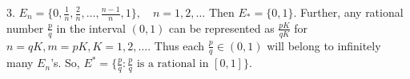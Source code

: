 \documentclass[preview]{standalone}
\begin{document}
\begin{center}
3. $E_n = \{0, \frac{1}{n}, \frac{2}{n}, \dots, \frac{n-1}{n}, 1\}, \quad n = 1, 2, \dots$ Then $E_* = \{0, 1\}$. Further, any rational number $\frac{p}{q}$ in the interval $(0, 1)$ can be represented as $\frac{pK}{qK}$ for $n = qK, m = pK, K = 1, 2, \dots$. Thus each $\frac{p}{q} \in (0, 1)$ will belong to infinitely many $E_n$'s. So, $E^* = \{\frac{p}{q}: \frac{p}{q} \text{ is a rational in } [0, 1]\}$.
\end{center}
\end{document}
